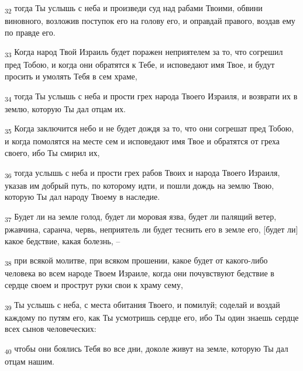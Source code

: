 \begin{tcolorbox}
\textsubscript{32} тогда Ты услышь с неба и произведи суд над рабами Твоими, обвини виновного, возложив поступок его на голову его, и оправдай правого, воздав ему по правде его.
\end{tcolorbox}
\begin{tcolorbox}
\textsubscript{33} Когда народ Твой Израиль будет поражен неприятелем за то, что согрешил пред Тобою, и когда они обратятся к Тебе, и исповедают имя Твое, и будут просить и умолять Тебя в сем храме,
\end{tcolorbox}
\begin{tcolorbox}
\textsubscript{34} тогда Ты услышь с неба и прости грех народа Твоего Израиля, и возврати их в землю, которую Ты дал отцам их.
\end{tcolorbox}
\begin{tcolorbox}
\textsubscript{35} Когда заключится небо и не будет дождя за то, что они согрешат пред Тобою, и когда помолятся на месте сем и исповедают имя Твое и обратятся от греха своего, ибо Ты смирил их,
\end{tcolorbox}
\begin{tcolorbox}
\textsubscript{36} тогда услышь с неба и прости грех рабов Твоих и народа Твоего Израиля, указав им добрый путь, по которому идти, и пошли дождь на землю Твою, которую Ты дал народу Твоему в наследие.
\end{tcolorbox}
\begin{tcolorbox}
\textsubscript{37} Будет ли на земле голод, будет ли моровая язва, будет ли палящий ветер, ржавчина, саранча, червь, неприятель ли будет теснить его в земле его, [будет ли] какое бедствие, какая болезнь, --
\end{tcolorbox}
\begin{tcolorbox}
\textsubscript{38} при всякой молитве, при всяком прошении, какое будет от какого-либо человека во всем народе Твоем Израиле, когда они почувствуют бедствие в сердце своем и прострут руки свои к храму сему,
\end{tcolorbox}
\begin{tcolorbox}
\textsubscript{39} Ты услышь с неба, с места обитания Твоего, и помилуй; соделай и воздай каждому по путям его, как Ты усмотришь сердце его, ибо Ты один знаешь сердце всех сынов человеческих:
\end{tcolorbox}
\begin{tcolorbox}
\textsubscript{40} чтобы они боялись Тебя во все дни, доколе живут на земле, которую Ты дал отцам нашим.
\end{tcolorbox}
